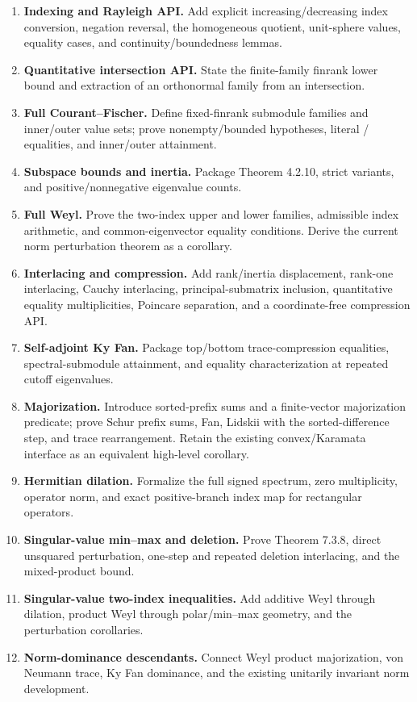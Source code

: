 \begin{enumerate}[leftmargin=2em]
\item \textbf{Indexing and Rayleigh API.} Add explicit increasing/decreasing index conversion, negation reversal, the homogeneous quotient, unit-sphere values, equality cases, and continuity/boundedness lemmas.
\item \textbf{Quantitative intersection API.} State the finite-family finrank lower bound and extraction of an orthonormal family from an intersection.
\item \textbf{Full Courant--Fischer.} Define fixed-finrank submodule families and inner/outer value sets; prove nonempty/bounded hypotheses, literal / equalities, and inner/outer attainment.
\item \textbf{Subspace bounds and inertia.} Package Theorem 4.2.10, strict variants, and positive/nonnegative eigenvalue counts.
\item \textbf{Full Weyl.} Prove the two-index upper and lower families, admissible index arithmetic, and common-eigenvector equality conditions. Derive the current norm perturbation theorem as a corollary.
\item \textbf{Interlacing and compression.} Add rank/inertia displacement, rank-one interlacing, Cauchy interlacing, principal-submatrix inclusion, quantitative equality multiplicities, Poincare separation, and a coordinate-free compression API.
\item \textbf{Self-adjoint Ky Fan.} Package top/bottom trace-compression equalities, spectral-submodule attainment, and equality characterization at repeated cutoff eigenvalues.
\item \textbf{Majorization.} Introduce sorted-prefix sums and a finite-vector majorization predicate; prove Schur prefix sums, Fan, Lidskii with the sorted-difference step, and trace rearrangement. Retain the existing convex/Karamata interface as an equivalent high-level corollary.
\item \textbf{Hermitian dilation.} Formalize the full signed spectrum, zero multiplicity, operator norm, and exact positive-branch index map for rectangular operators.
\item \textbf{Singular-value min--max and deletion.} Prove Theorem 7.3.8, direct unsquared perturbation, one-step and repeated deletion interlacing, and the mixed-product bound.
\item \textbf{Singular-value two-index inequalities.} Add additive Weyl through dilation, product Weyl through polar/min--max geometry, and the perturbation corollaries.
\item \textbf{Norm-dominance descendants.} Connect Weyl product majorization, von Neumann trace, Ky Fan dominance, and the existing unitarily invariant norm development.
\end{enumerate}

